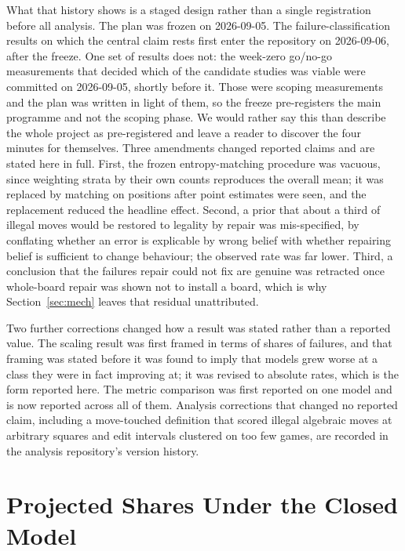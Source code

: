 \documentclass[11pt]{article}
\begin{document}
What that history shows is a staged design rather than a single registration before
all analysis. The plan was frozen on 2026-09-05. The failure-classification
results on which the central claim rests first enter the repository on
2026-09-06, after the freeze. One set of results does not: the week-zero
go/no-go measurements that decided which of the candidate studies was viable were
committed on 2026-09-05, shortly before it. Those were scoping measurements
and the plan was written in light of them, so the freeze pre-registers the main
programme and not the scoping phase. We would rather say this than describe the whole
project as pre-registered and leave a reader to discover the four minutes for
themselves.
Three amendments changed reported claims and are stated here in full. First, the
frozen entropy-matching procedure was vacuous, since weighting strata by their own
counts reproduces the overall mean; it was replaced by matching on positions after
point estimates were seen, and the replacement reduced the headline effect. Second,
a prior that about a third of illegal moves would be restored to legality by repair
was mis-specified, by conflating whether an error is explicable by wrong belief with
whether repairing belief is sufficient to change behaviour; the observed rate was
far lower. Third, a conclusion that the failures repair could not fix are genuine
was retracted once whole-board repair was shown not to install a board, which is
why Section~\ref{sec:mech} leaves that residual unattributed.

Two further corrections changed how a result was stated rather than a reported
value. The scaling result was first framed in terms of shares of failures, and that
framing was stated before it was found to imply that models grew worse at a class
they were in fact improving at; it was revised to absolute rates, which is the form
reported here. The metric comparison was first reported on one model and is now
reported across all of them. Analysis corrections that changed no reported claim,
including a move-touched definition that scored illegal algebraic moves at
arbitrary squares and edit intervals clustered on too few games, are recorded in the
analysis repository's version history.

\nocite{rathore2026coherent}



\section{Projected Shares Under the Closed Model}
\label{app:proj}
\end{document}

